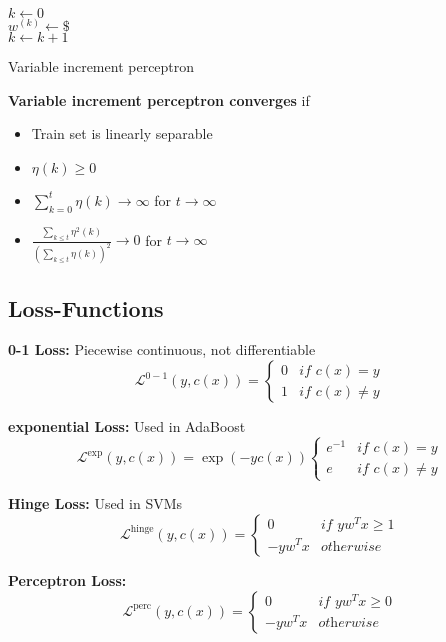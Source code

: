 \begin{algorithm}[H]  
	$k\gets 0$ \\
	$w^{(k)} \gets \$ $\\
   {
      $k\gets k+1$ 
  	}
  \caption{Variable increment perceptron}
\end{algorithm}
\textbf{Variable increment perceptron converges} if
\begin{itemize}
	\item Train set is linearly separable
	\item $\eta(k) \geq 0$
	\item $\sum_{k=0}^t\eta(k) \to \infty$ for $t\to\infty$
	\item $\frac{\sum_{k\leq t}\eta^2(k)}{\left(\sum_{k\leq t}\eta(k)\right)^2}\to 0$ for $t\to\infty$
\end{itemize}




\subsection{Loss-Functions}
\textbf{0-1 Loss: } Piecewise continuous, not differentiable
$$
\mathcal L^{0-1}\left(y, c(x)\right) = 
	\begin{cases}
		0 & \textit{if } c(x) = y\\
		1 & \textit{if } c(x) \neq y
	\end{cases}
$$

\textbf{exponential Loss: } Used in AdaBoost
$$
\mathcal L^{\exp}\left(y, c(x)\right) = 
\exp(-yc(x))
	\begin{cases}
		e^{-1} &\textit{if } c(x) = y \\
		e &\textit{if } c(x) \neq y
	\end{cases}
$$

\textbf{Hinge Loss: } Used in SVMs
$$
\mathcal L^{\text{hinge}}\left(y, c(x)\right) = 
	\begin{cases}
		0 & \textit{if } y w^Tx\geq 1 \\
		-y w^Tx & \textit{otherwise } 
	\end{cases}
$$

\textbf{Perceptron Loss: }
$$
\mathcal L^{\text{perc}}\left(y, c(x)\right) = 
	\begin{cases}
		0 & \textit{if } yw^Tx\geq 0 \\
		-yw^Tx & \textit{otherwise } 
	\end{cases}
$$

